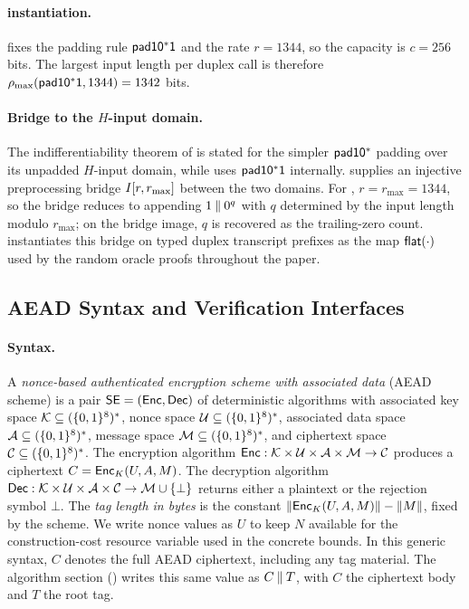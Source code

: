 \paragraph{\TW{} instantiation.}
\TW{} fixes the padding rule $\mathsf{pad10^*1}{}$ and the rate $r = 1344$, so
the capacity is $c = 256$ bits. The largest input length per duplex call
is therefore $\rho_{\max}(\mathsf{pad10^*1}, 1344) = 1342$ bits.

\paragraph{Bridge to the \texorpdfstring{$H$}{H}-input domain.}
The indifferentiability theorem of \cite{BDPV08} is stated for the
simpler $\mathsf{pad10^*}{}$ padding over its unpadded $H$-input domain, while
\TW{} uses $\mathsf{pad10^*1}{}$ internally. \cite[Theorem~3]{BDPV11} supplies
an injective preprocessing bridge $I[r, r_{\max}]$ between the two
domains. For \TW{}, $r = r_{\max} = 1344$, so the bridge reduces to
appending $1 \mathbin{\|} 0^q$ with $q$ determined by the input length modulo
$r_{\max}$; on the bridge image, $q$ is recovered as the trailing-zero
count.  instantiates this bridge on typed \TW{} duplex
transcript prefixes as the map $\mathsf{flat}(\cdot)$ used by the
random oracle proofs throughout the paper.

\subsection{AEAD Syntax and Verification Interfaces}
\label{sec:ae-defs}

\paragraph{Syntax.}
A \emph{nonce-based authenticated encryption scheme with associated
data} (AEAD scheme) is a pair $\mathsf{SE} = (\mathsf{Enc}, \mathsf{Dec})$ of deterministic
algorithms with associated key space $\mathcal{K} \subseteq (\{0,1\}^8)^*$,
nonce space $\mathcal{U} \subseteq (\{0,1\}^8)^*$, associated data space
$\mathcal{A} \subseteq (\{0,1\}^8)^*$, message space $\mathcal{M} \subseteq
(\{0,1\}^8)^*$, and ciphertext space $\mathcal{C} \subseteq (\{0,1\}^8)^*$. The
encryption algorithm $\mathsf{Enc} : \mathcal{K} \times \mathcal{U} \times
\mathcal{A} \times \mathcal{M} \to \mathcal{C}$ produces a ciphertext
$C = \mathsf{Enc}_K(U, A, M)$. The decryption algorithm $\mathsf{Dec} : \mathcal{K}
\times \mathcal{U} \times \mathcal{A} \times \mathcal{C} \to
\mathcal{M} \cup \{\bot\}$ returns either a plaintext or the
rejection symbol $\bot$. The \emph{tag length in bytes} is the constant
$\|\mathsf{Enc}_K(U, A, M)\| - \|M\|$, fixed by the scheme.
We write nonce values as $U$ to keep $N$ available for the construction-cost
resource variable used in the concrete bounds.
In this generic syntax, $C$ denotes the full AEAD ciphertext, including
any tag material. The \TW{} algorithm section () writes this same value as
$C \mathbin{\|} T$, with $C$ the ciphertext body and $T$ the root tag.

